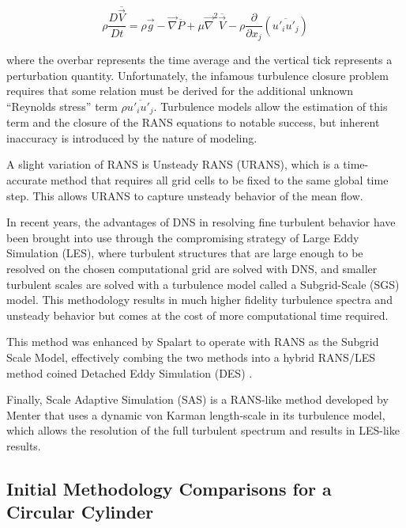 \documentclass[journal]{new-aiaa}
\begin{document}
\begin{equation}
\label{eqn:rans}
\rho \dfrac{D \overline{\vec{V}}}{D t}
    = \rho\vec{g} - \vec{\nabla} \overline{P}
    + \mu \vec{\nabla}^2 \overline{\vec{V}}
    - \rho \dfrac{\partial}{\partial x_j} \left( \overline{u'_i u'_j} \right)
\end{equation}

\noindent where the overbar represents the time average and the vertical tick represents a perturbation quantity. Unfortunately, the infamous turbulence closure problem requires that some relation must be derived for the additional unknown ``Reynolds stress'' term $\rho \overline{u'_i u'_j}$. Turbulence models allow the estimation of this term and the closure of the RANS equations to notable success, but inherent inaccuracy is introduced by the nature of modeling.

A slight variation of RANS is Unsteady RANS (URANS), which is a time-accurate method that requires all grid cells to be fixed to the same global time step.  This allows URANS to capture unsteady behavior of the mean flow.

In recent years, the advantages of DNS in resolving fine turbulent behavior have been brought into use through the compromising strategy of Large Eddy Simulation (LES), where turbulent structures that are large enough to be resolved on the chosen computational grid are solved with DNS, and smaller turbulent scales are solved with a turbulence model called a Subgrid-Scale (SGS) model. This methodology results in much higher fidelity turbulence spectra and unsteady behavior but comes at the cost of more computational time required.

This method was enhanced by Spalart to operate with RANS as the Subgrid Scale Model, effectively combing the two methods into a hybrid RANS/LES method coined Detached Eddy Simulation (DES) \cite{spalart2009detachededdy}.

Finally, Scale Adaptive Simulation (SAS) is a RANS-like method developed by Menter \cite{menter2005scaleadaptive} that uses a dynamic von Karman length-scale in its turbulence model, which allows the resolution of the full turbulent spectrum and results in LES-like results.











\subsection{Initial Methodology Comparisons for a Circular Cylinder} \label{subsec:initialcompare}
\end{document}
